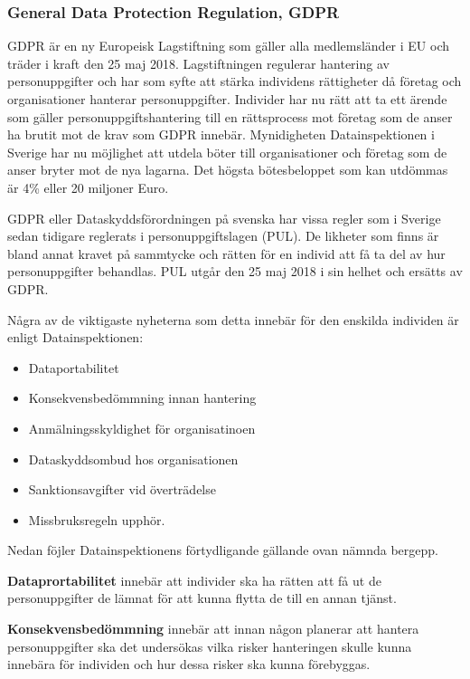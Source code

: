 \documentclass[swedish, a4paper,12pt]{article}
\begin{document}
\subsubsection{General Data Protection Regulation, GDPR}
GDPR är en ny Europeisk Lagstiftning som gäller alla medlemsländer i EU och träder i kraft den 25 maj 2018.
Lagstiftningen regulerar hantering av personuppgifter och har som syfte att stärka individens rättigheter då företag och organisationer hanterar personuppgifter.\cite{GDPRibm}\cite{GDPRdatainspektionen}
Individer har nu rätt att ta ett ärende som gäller personuppgiftshantering till en rättsprocess mot företag som de anser ha brutit mot de krav som GDPR innebär.
Mynidigheten Datainspektionen i Sverige har nu möjlighet att utdela böter till organisationer och företag som de anser bryter mot de nya lagarna. Det högsta bötesbeloppet som kan utdömmas är 4\% eller 20 miljoner Euro.\cite{GDPRibm}

GDPR eller Dataskyddsförordningen på svenska har vissa regler som i Sverige sedan tidigare reglerats i personuppgiftslagen (PUL). De likheter som finns är bland annat kravet på sammtycke och rätten för en individ att få ta del av hur personuppgifter behandlas. PUL utgår den 25 maj 2018 i sin helhet och ersätts av GDPR.\cite{GDPRdatainspektionen}

Några av de viktigaste nyheterna som detta innebär för den enskilda individen är enligt Datainspektionen\cite{GDPRdatainspektionen}:
\begin{itemize}
  \item Dataportabilitet
  \item Konsekvensbedömmning innan hantering
  \item Anmälningsskyldighet för organisatinoen
  \item Dataskyddsombud hos organisationen
  \item Sanktionsavgifter vid överträdelse
  \item Missbruksregeln upphör.
\end{itemize}
\newpage
Nedan föjler Datainspektionens\cite{GDPRdatainspektionen} förtydligande gällande ovan nämnda bergepp.

\textbf{Dataprortabilitet} innebär att individer ska ha rätten att få ut de personuppgifter de lämnat för att kunna flytta de till en annan tjänst.

\textbf{Konsekvensbedömmning} innebär att innan någon planerar att hantera personuppgifter ska det undersökas vilka risker hanteringen skulle kunna innebära för individen och hur dessa risker ska kunna förebyggas.
\end{document}
